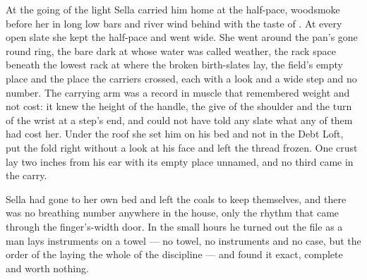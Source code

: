 \scenebreak

At the going of the light Sella carried him home at the half-pace, woodsmoke before her in long low bars and river wind behind with the taste of . At every open slate she kept the half-pace and went wide. She went around the pan's gone round ring, the bare dark  at  whose water was called weather, the rack space beneath the lowest rack at  where the broken birth-slates lay, the field's empty place and the place the carriers crossed, each with a look and a wide step and no number. The carrying arm was a record in muscle that remembered weight and not cost: it knew the height of the handle, the give of the shoulder and the turn of the wrist at a step's end, and could not have told any slate what any of them had cost her. Under the roof she set him on his bed and not in the Debt Loft, put the fold right without a look at his face and left the thread frozen. One crust lay two inches from his ear with its empty place unnamed, and no third came in the carry.

\scenebreak

Sella had gone to her own bed and left the coals to keep themselves, and there was no breathing number anywhere in the house, only the rhythm that came through the finger's-width door. In the small hours he turned out the file as a man lays instruments on a towel --- no towel, no instruments and no case, but the order of the laying the whole of the discipline --- and found it exact, complete and worth nothing.

